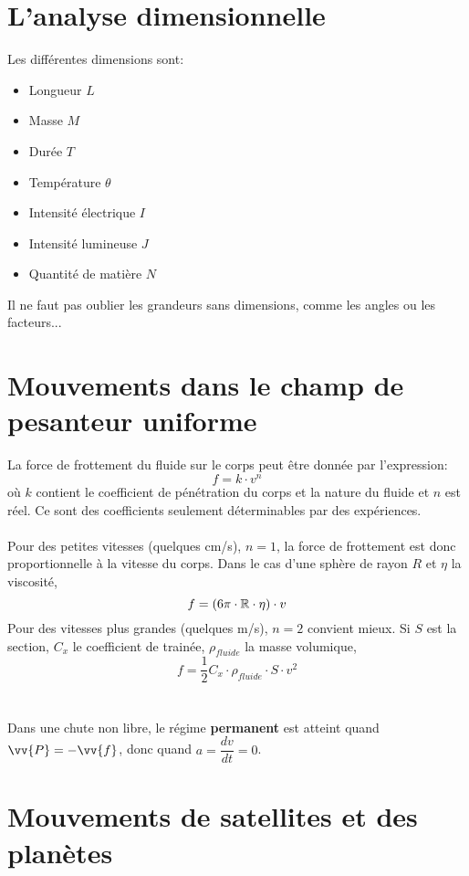 \section{L'analyse dimensionnelle}

\begin{Definition}

Les différentes dimensions sont:
\begin{itemize}
\item Longueur $L$
\item Masse $M$
\item Durée $T$
\item Température $\theta$
\item Intensité électrique $I$
\item Intensité lumineuse $J$
\item Quantité de matière $N$
\end{itemize}
Il ne faut pas oublier les grandeurs sans dimensions, comme les angles ou les facteurs...
\end{Definition}


\section{Mouvements dans le champ de pesanteur uniforme}

\begin{Definition}

La force de frottement du fluide sur le corps peut être donnée par l'expression:
$$f=k\cdot v^n$$
où $k$ contient le coefficient de pénétration du corps et la nature du fluide et $n$ est réel. Ce sont des coefficients seulement déterminables par des expériences.\\\\
Pour des petites vitesses (quelques cm/s), $n=1$, la force de frottement est donc proportionnelle à la vitesse du corps. Dans le cas d'une sphère de rayon $R$ et $\eta$ la viscosité,
$$f=(6\pi\cdot\mathbb{R}\cdot\eta )\cdot v$$
Pour des vitesses plus grandes (quelques m/s), $n=2$ convient mieux. Si $S$ est la section, $C_{x}$ le coefficient de trainée, $\rho_{fluide}$ la masse volumique,
$$ f=\frac{1}{2}C_{x}\cdot\rho_{fluide}\cdot S\cdot v^2 $$  \\\\
Dans une chute non libre, le régime \textbf{permanent} est atteint quand $\vv{P}=-\vv{f}$, donc quand $a=\dfrac{dv}{dt}=0$.
\end{Definition}


\section{Mouvements de satellites et des planètes}

